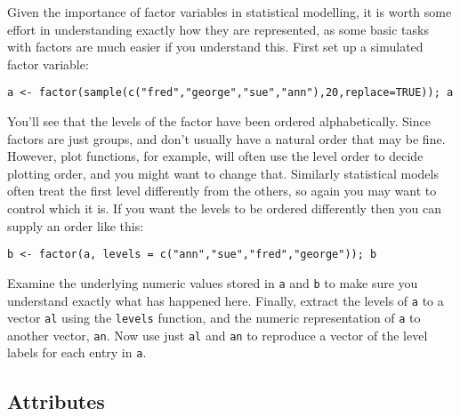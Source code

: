\documentclass[10pt] {article}
\theoremstyle{definition}
\begin{document}
 Given the importance of factor variables in statistical modelling, it is worth some effort in understanding exactly how they are represented, as some basic tasks with factors are much easier if you understand this. First set up a simulated factor variable:
\begin{lstlisting}
a <- factor(sample(c("fred","george","sue","ann"),20,replace=TRUE)); a
\end{lstlisting}
You'll see that the levels of the factor have been ordered alphabetically. Since factors are just groups, and don't usually have a natural order that may be fine. However, plot functions, for example, will often use the level order to decide plotting order, and you might want to change that. Similarly statistical models often treat the first level differently from the others, so again you may want to control which it is. If you want the levels to be ordered differently then you can supply an order like this:
\begin{lstlisting}
b <- factor(a, levels = c("ann","sue","fred","george")); b
\end{lstlisting}
Examine the underlying numeric values stored in {\tt a} and {\tt b} to make sure you understand exactly what has happened here. Finally, extract the levels of {\tt a} to a vector {\tt al} using the {\tt levels} function, and the numeric representation of {\tt a} to another vector, {\tt an}. Now use just {\tt al} and {\tt an} to reproduce a vector of the level labels for each entry in {\tt a}.
 

 


\subsection{Attributes}
\end{document}
